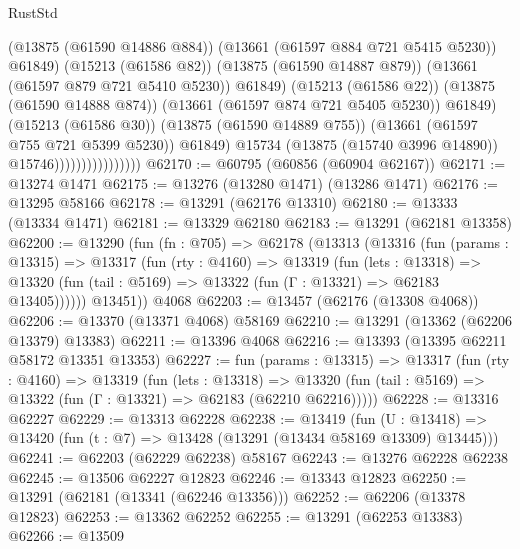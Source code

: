 \begin{lexlean}{RustStd}
\begin{coremodule}
                                            (@13875 (@61590 @14886 @884))
                                            (@13661 (@61597 @884 @721 @5415 @5230))
                                            @61849)
                                          (@15213 (@61586 @82))
                                          (@13875 (@61590 @14887 @879))
                                          (@13661 (@61597 @879 @721 @5410 @5230))
                                          @61849)
                                        (@15213 (@61586 @22))
                                        (@13875 (@61590 @14888 @874))
                                        (@13661 (@61597 @874 @721 @5405 @5230))
                                        @61849)
                                      (@15213 (@61586 @30))
                                      (@13875 (@61590 @14889 @755))
                                      (@13661 (@61597 @755 @721 @5399 @5230))
                                      @61849)
                                    @15734
                                    (@13875 (@15740 @3996 @14890))
                                    @15746))))))))))))))))
@62170 := @60795 (@60856 (@60904 @62167))
@62171 := @13274 @1471
@62175 := @13276 (@13280 @1471) (@13286 @1471)
@62176 := @13295 @58166
@62178 := @13291 (@62176 @13310)
@62180 := @13333 (@13334 @1471)
@62181 := @13329 @62180
@62183 := @13291 (@62181 @13358)
@62200 := @13290
    (fun (fn : @705) =>
    @62178
      (@13313
        (@13316
          (fun (params : @13315) =>
          @13317
            (fun (rty : @4160) =>
            @13319
              (fun (lets : @13318) =>
              @13320 (fun (tail : @5169) => @13322 (fun (Γ : @13321) => @62183 @13405))))))
        @13451))
    @4068
@62203 := @13457 (@62176 (@13308 @4068))
@62206 := @13370 (@13371 @4068) @58169
@62210 := @13291 (@13362 (@62206 @13379) @13383)
@62211 := @13396 @4068
@62216 := @13393 (@13395 @62211 @58172 @13351 @13353)
@62227 := fun (params : @13315) =>
  @13317
    (fun (rty : @4160) =>
    @13319
      (fun (lets : @13318) =>
      @13320 (fun (tail : @5169) => @13322 (fun (Γ : @13321) => @62183 (@62210 @62216)))))
@62228 := @13316 @62227
@62229 := @13313 @62228
@62238 := @13419
    (fun (U : @13418) => @13420 (fun (t : @7) => @13428 (@13291 (@13434 @58169 @13309) @13445)))
@62241 := @62203 (@62229 @62238) @58167
@62243 := @13276 @62228 @62238
@62245 := @13506 @62227 @12823
@62246 := @13343 @12823
@62250 := @13291 (@62181 (@13341 (@62246 @13356)))
@62252 := @62206 (@13378 @12823)
@62253 := @13362 @62252
@62255 := @13291 (@62253 @13383)
@62266 := @13509

\end{coremodule}
\end{lexlean}
